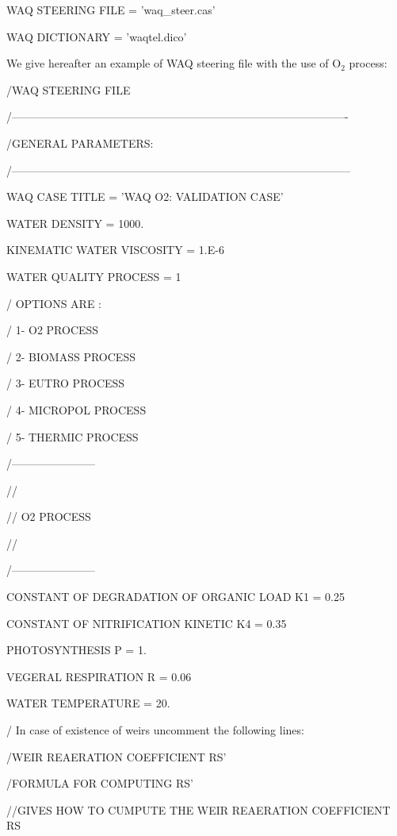  WAQ STEERING FILE    = 'waq\_steer.cas'

 WAQ DICTIONARY         = 'waqtel.dico'

 We give hereafter an example of WAQ steering file with the use of O${}_{2}$ process:



 /WAQ STEERING FILE

 /-------------------------------------------------------------------------------------------

 /GENERAL PARAMETERS:

 /--------------------------------------------------------------------------------------------

 WAQ CASE TITLE                = 'WAQ O2: VALIDATION CASE'

 WATER DENSITY                 = 1000.

 KINEMATIC WATER VISCOSITY      = 1.E-6

 WATER QUALITY PROCESS         = 1

 /   OPTIONS ARE :

 /       1- O2 PROCESS

 /       2- BIOMASS PROCESS

 /       3- EUTRO PROCESS

 /       4- MICROPOL PROCESS

 /       5- THERMIC PROCESS

 /-----------------------

 //

 // O2 PROCESS

 //

 /-----------------------

 CONSTANT OF DEGRADATION OF ORGANIC LOAD K1 = 0.25

 CONSTANT OF NITRIFICATION KINETIC K4                     = 0.35

 PHOTOSYNTHESIS P                                                          = 1.

 VEGERAL RESPIRATION R                                                 = 0.06

 WATER TEMPERATURE                                                      = 20.

 / In case of existence of weirs uncomment the following lines:

 /WEIR REAERATION COEFFICIENT RS'

 /FORMULA FOR COMPUTING RS'

 //GIVES HOW TO CUMPUTE THE WEIR REAERATION COEFFICIENT RS

